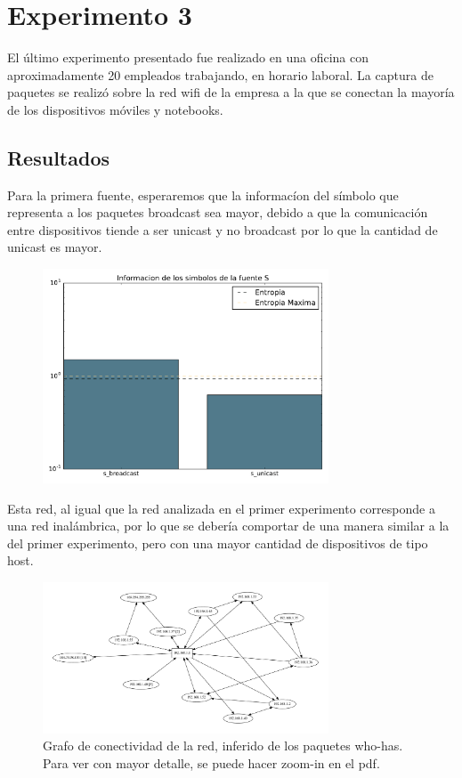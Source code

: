 \section{Experimento 3}

El último experimento presentado fue realizado en una oficina con aproximadamente 20 empleados trabajando, en horario laboral. La captura de paquetes se realizó sobre la red wifi de la empresa a la que se conectan la mayoría de los dispositivos móviles y notebooks.

\subsection{Resultados}

Para la primera fuente,  esperaremos que la informacíon del símbolo que representa a los paquetes broadcast sea mayor, debido a que la comunicación entre dispositivos tiende a ser unicast y no broadcast por lo que la cantidad de unicast es mayor.

\begin{figure}[H]
  \centering
  \includegraphics[width=8.5cm]{exp_empresa/grafico1.pdf}
  \caption{\normalfont }
\end{figure}

Esta red, al igual que la red analizada en el primer experimento corresponde a una red inalámbrica, por lo que se debería comportar de una manera similar a la del primer experimento, pero con una mayor cantidad de dispositivos de tipo host.

\begin{figure}[H]
  \centering
  \includegraphics[width=8.5cm]{exp_empresa/grafico2.pdf}
  \caption{  \normalfont Grafo de conectividad de la red, inferido de los paquetes who-has. Para ver con mayor detalle, se puede hacer zoom-in en el pdf. }
\end{figure}

